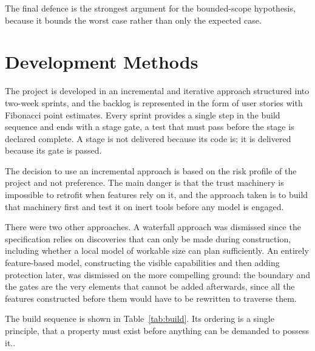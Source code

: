 \documentclass{FastFyp}
\begin{document}
The final defence is the strongest argument for the bounded-scope hypothesis, because it bounds the worst case rather than only the expected case.

\section{Development Methods}
The project is developed in an incremental and iterative approach structured into two-week sprints, and the backlog is represented in the form of user stories with Fibonacci point estimates. Every sprint provides a single step in the build sequence and ends with a stage gate, a test that must pass before the stage is declared complete. A stage is not delivered because its code is; it is delivered because its gate is passed.

The decision to use an incremental approach is based on the risk profile of the project and not preference. The main danger is that the trust machinery is impossible to retrofit when features rely on it, and the approach taken is to build that machinery first and test it on inert tools before any model is engaged.

There were two other approaches. A waterfall approach was dismissed since the specification relies on discoveries that can only be made during construction, including whether a local model of workable size can plan sufficiently. An entirely feature-based model, constructing the visible capabilities and then adding protection later, was dismissed on the more compelling ground: the boundary and the gates are the very elements that cannot be added afterwards, since all the features constructed before them would have to be rewritten to traverse them.

The build sequence is shown in Table~\ref{tab:build}. Its ordering is a single principle, that a property must exist before anything can be demanded to possess it..
\end{document}
